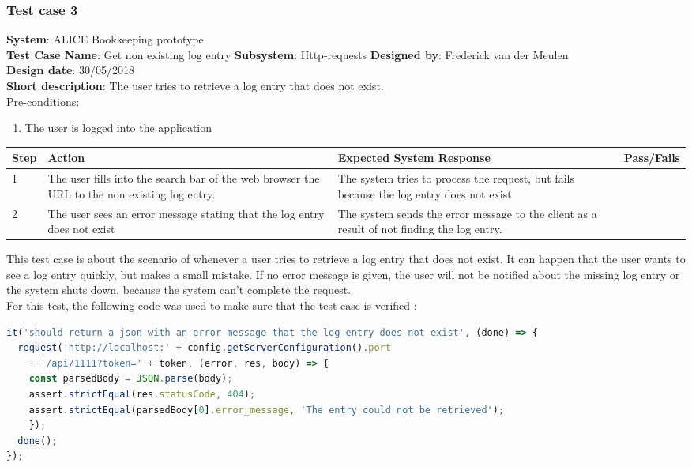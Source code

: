 \documentclass[paper=a4, fontsize=11pt,twoside]{scrartcl}	%
\begin{document}
\subsubsection{Test case 3}
\textbf{System}:  ALICE Bookkeeping prototype \\
\textbf{Test Case Name}:  Get non existing log entry
\textbf{Subsystem}:  Http-requests
\textbf{Designed by}:  Frederick van der Meulen\\
\textbf{Design date}: 30/05/2018 \\
\textbf{Short description}: The user tries to retrieve a log entry that does not exist. \\

Pre-conditions: 
\begin{enumerate}
\item The user is logged into the application
\end{enumerate}

\begin{longtable}{ | p{0.8cm} | p{4.5cm} | p{6cm}  | p{1.5cm} |}
\hline
Step & Action & Expected System Response & Pass/Fails  \\ \hline
1 & The user fills into the search bar of the web browser the URL to the non existing log entry. & The system tries to process the request, but fails because the log entry does not exist &  \\ \hline
2 & The user sees an error message stating that the log entry does not exist & The system sends the error message to the client as a result of not finding the log entry. &  \\ \hline
\end{longtable}
\newpage
This test case is about the scenario of whenever a user tries to retrieve a log entry that does not exist. It can happen that the user wants to see a log entry quickly, but makes a small mistake. If no error message is given, the user will not be notified about the missing log entry or the system shuts down, because the system can't complete the request. \\ 
For this test, the following code was used to make sure that the test case is verified :
\begin{lstlisting}[language=JavaScript, frame=single]
it('should return a json with an error message that the log entry does not exist', (done) => {
  request('http://localhost:' + config.getServerConfiguration().port
    + '/api/1111?token=' + token, (error, res, body) => {
    const parsedBody = JSON.parse(body);
    assert.strictEqual(res.statusCode, 404);
    assert.strictEqual(parsedBody[0].error_message, 'The entry could not be retrieved');
    });
  done();
});

\end{lstlisting}
\end{document}
